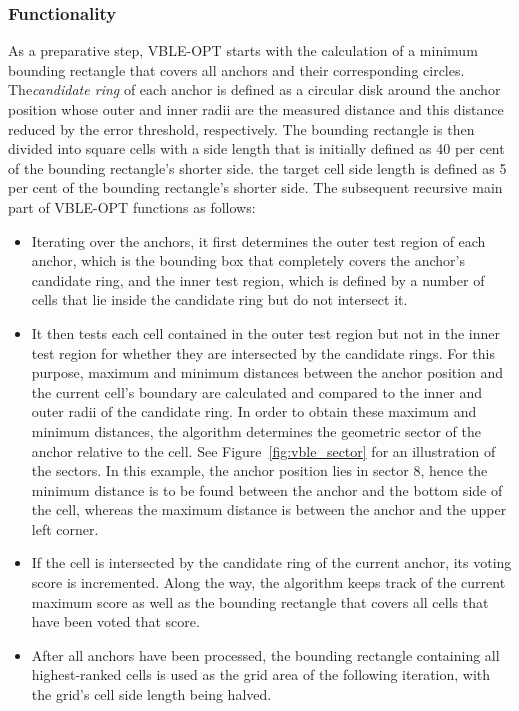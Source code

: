 \subsubsection{Functionality}
As a preparative step, VBLE-OPT starts with the calculation of a minimum bounding rectangle that covers all anchors and their corresponding circles. The\emph{candidate ring} of each anchor is defined as a circular disk around the anchor position whose outer and inner radii are the measured distance and this distance reduced by the error threshold, respectively. The bounding rectangle is then divided into square cells with a side length that is initially defined as 40 per cent of the bounding rectangle's shorter side. the target cell side length is defined as 5 per cent of the bounding rectangle's shorter side. The subsequent recursive main part of VBLE-OPT functions as follows:
\begin{itemize}
\item Iterating over the anchors, it first determines the outer test region of each anchor, which is the bounding box that completely covers the anchor's candidate ring, and the inner test region, which is defined by a number of cells that lie inside the candidate ring but do not intersect it.
\item It then tests each cell contained in the outer test region but not in the inner test region for whether they are intersected by the candidate rings. For this purpose, maximum and minimum distances between the anchor position and the current cell's boundary are calculated and compared to the inner and outer radii of the candidate ring. In order to obtain these maximum and minimum distances, the algorithm determines the geometric sector of the anchor relative to the cell. See Figure~\ref{fig:vble_sector} for an illustration of the sectors. In this example, the anchor position lies in sector 8, hence the minimum distance is to be found between the anchor and the bottom side of the cell, whereas the maximum distance is between the anchor and the upper left corner.
\item If the cell is intersected by the candidate ring of the current anchor, its voting score is incremented. Along the way, the algorithm keeps track of the current maximum score as well as the bounding rectangle that covers all cells that have been voted that score.
\item After all anchors have been processed, the bounding rectangle containing all highest-ranked cells is used as the grid area of the following iteration, with the grid's cell side length being halved.
\end{itemize}

